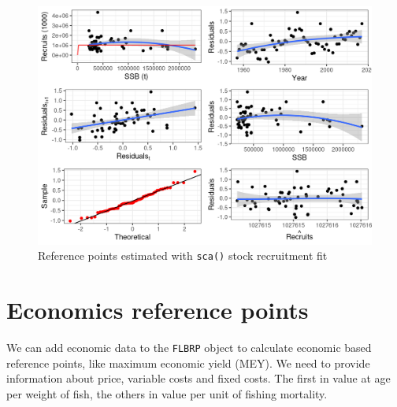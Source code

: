 \documentclass[
]{book}
\begin{document}
\begin{figure}
\centering
\includegraphics{_bookdown_files/_main_files/figure-html/a4arp-1.png}
\caption{\label{fig:a4arp}Reference points estimated with \texttt{sca()} stock recruitment fit}
\end{figure}

\hypertarget{economics-reference-points}{%
\section{Economics reference points}\label{economics-reference-points}}

We can add economic data to the \texttt{FLBRP} object to calculate economic based reference points, like maximum economic yield (MEY). We need to provide information about price, variable costs and fixed costs. The first in value at age per weight of fish, the others in value per unit of fishing mortality.
\end{document}
